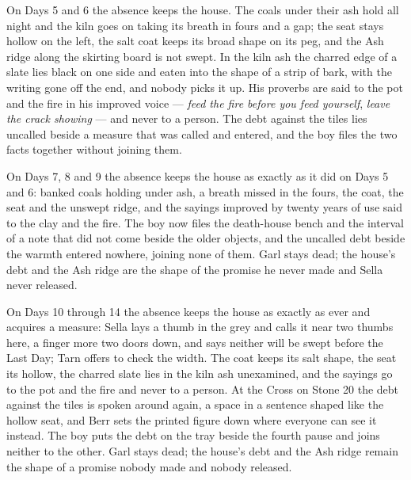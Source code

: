 \documentclass{design/chronicle}
\begin{document}
{On Days 5 and 6 the absence keeps the house. The coals under their ash hold all night and the kiln goes on taking its breath in fours and a gap; the seat stays hollow on the left, the salt coat keeps its broad shape on its peg, and the Ash ridge along the skirting board is not swept. In the kiln ash the charred edge of a slate lies black on one side and eaten into the shape of a strip of bark, with the writing gone off the end, and nobody picks it up. His proverbs are said to the pot and the fire in his improved voice --- \emph{feed the fire before you feed yourself}, \emph{leave the crack showing} --- and never to a person. The debt against the tiles lies uncalled beside a measure that was called and entered, and the boy files the two facts together without joining them.

On Days 7, 8 and 9 the absence keeps the house as exactly as it did on Days 5 and 6: banked coals holding under ash, a breath missed in the fours, the coat, the seat and the unswept ridge, and the sayings improved by twenty years of use said to the clay and the fire. The boy now files the death-house bench and the interval of a note that did not come beside the older objects, and the uncalled debt beside the warmth entered nowhere, joining none of them. Garl stays dead; the house’s debt and the Ash ridge are the shape of the promise he never made and Sella never released.

On Days 10 through 14 the absence keeps the house as exactly as ever and acquires a measure: Sella lays a thumb in the grey and calls it near two thumbs here, a finger more two doors down, and says neither will be swept before the Last Day; Tarn offers to check the width. The coat keeps its salt shape, the seat its hollow, the charred slate lies in the kiln ash unexamined, and the sayings go to the pot and the fire and never to a person. At the Cross on Stone 20 the debt against the tiles is spoken around again, a space in a sentence shaped like the hollow seat, and Berr sets the printed figure down where everyone can see it instead. The boy puts the debt on the tray beside the fourth pause and joins neither to the other. Garl stays dead; the house’s debt and the Ash ridge remain the shape of a promise nobody made and nobody released.

}
\end{document}
